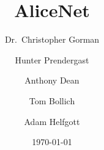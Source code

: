 
\author{Dr.~Christopher Gorman \and Hunter Prendergast \and Anthony Dean
\and Tom Bollich \and Adam Helfgott}
\title{AliceNet}
\date{\today}

\renewcommand{\abstractname}{TL;DR}






